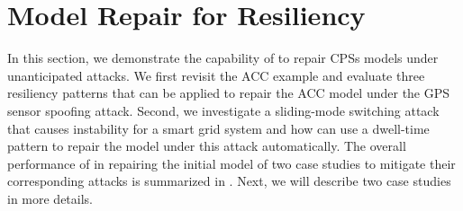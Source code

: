 \section{Model Repair for Resiliency}
%
%
In this section, we demonstrate the capability of \toolreaffirm to repair CPSs models under unanticipated attacks. We first revisit the ACC example and evaluate three resiliency patterns that can be applied to repair the ACC model under the GPS sensor spoofing attack. Second, we investigate a sliding-mode switching attack that causes instability for a smart grid system and how \toolreaffirm can use a dwell-time pattern to repair the model under this attack automatically. The overall performance of \toolreaffirm in repairing the initial model of two case studies to mitigate their corresponding attacks is summarized in . Next, we will describe two case studies in more details.


